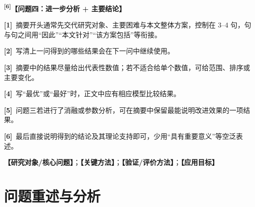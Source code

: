 \documentclass[UTF8,a4paper,12pt,fontset=fandol]{ctexart}
\newif\ifDraftAid
\newcommand{\ph}[1]{\textbf{\color{phg}【#1】}}
\newcommand{\detail}[1]{%
  \ifDraftAid\textnormal{\color{detailg}\small\,（参考写法：#1）}\fi}
\newcommand{\PHD}[2]{\ph{#1}\detail{#2}}
\newcommand{\SN}[1]{\textsuperscript{\color{noteg}\bfseries[#1]}}
\newcommand{\Note}[2]{\par\noindent\textbf{[#1]}\ #2}
\numberwithin{figure}{section}
\numberwithin{table}{section}
\begin{document}
{\par\medskip
\SN{6}\PHD{问题四：进一步分析 + 主要结论}{针对问题四，在〔核心任务〕中，本文引入〔度量或分析方法A、B〕，能够显著提升〔模型〕的性能。通过减小〔对象A与对象B〕之间的〔差异〕，增强模型的泛化能力，从而提高〔任务〕的准确性和鲁棒性。这些方法的引入为〔模型〕在〔实际场景〕中的有效性提供了有力的理论支持。}
}{
\Note{1}{摘要开头通常先交代研究对象、主要困难与本文整体方案，控制在 3--4 句，句与句之间用“因此”“本文针对”“该方案包括”等衔接。}
\Note{2}{写清上一问得到的哪些结果会在下一问中继续使用。}
\Note{3}{摘要中的结果尽量给出代表性数值；若不适合给单个数值，可给范围、排序或主要变化。}
\Note{4}{写“最优”或“最好”时，正文中应有相应模型比较结果。}
\Note{5}{问题三若进行了消融或参数分析，可在摘要中保留最能说明改进效果的一项结果。}
\Note{6}{最后直接说明得到的结论及其理论支持即可，少用“具有重要意义”等空泛表述。}
}

\vspace{0.8em}
\ph{研究对象/核心问题}；\ph{关键方法}；\ph{验证/评价方法}；\ph{应用目标}

\newpage
\begingroup{}\linespread{1.0}\selectfont\tableofcontents\endgroup
\vspace{0.8em}

\section{问题重述与分析}
\end{document}
